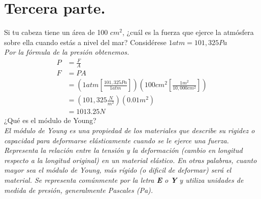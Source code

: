 \documentclass{article}
\begin{document}
\section*{Tercera parte.}
Si tu cabeza tiene un área de 100 $cm^2$, ¿cuál es la fuerza que ejerce la atmósfera sobre ella cuando estás a nivel del mar? Considérese $1atm = 101,325 Pa$ \\
\textit{Por la fórmula de la presión obtenemos.}
\begin{align*}
    P &= \frac{F}{A} \\
    F &= PA \\
    &= (1 atm\left[\frac{101,325Pa}{1 atm}\right])(100cm^2\left[\frac{1m^2}{10,000cm^2}\right]) \\
    &= (101,325\frac{N}{m^2})(0.01m^2) \\
    &= 1013.25 N
\end{align*}
¿Qué es el módulo de Young? \\
\textit{El módulo de Young es una propiedad de los materiales que describe su rigidez o capacidad para deformarse elásticamente cuando se le ejerce una fuerza. Representa la relación entre la tensión y la deformación (cambio en longitud respecto a la longitud original) en un material elástico. En otras palabras, cuanto mayor sea el módulo de Young, más rígido (o dificil de deformar) será el material. Se representa comúnmente por la letra \textbf{E} o \textbf{Y} y utiliza unidades de medida de presión, generalmente Pascales (Pa).} \\\\
\end{document}
